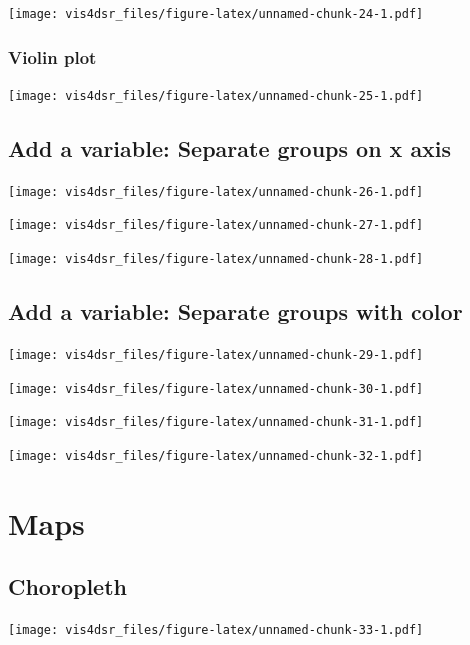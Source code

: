 \documentclass[
]{krantz}
\begin{document}
\texttt{[image: vis4dsr\_files/figure-latex/unnamed-chunk-24-1.pdf]}

\hypertarget{violin-plot}{%
\subsubsection{Violin plot}\label{violin-plot}}

\texttt{[image: vis4dsr\_files/figure-latex/unnamed-chunk-25-1.pdf]}

\hypertarget{add-a-variable-separate-groups-on-x-axis}{%
\subsection{Add a variable: Separate groups on x axis}\label{add-a-variable-separate-groups-on-x-axis}}

\texttt{[image: vis4dsr\_files/figure-latex/unnamed-chunk-26-1.pdf]}

\texttt{[image: vis4dsr\_files/figure-latex/unnamed-chunk-27-1.pdf]}

\texttt{[image: vis4dsr\_files/figure-latex/unnamed-chunk-28-1.pdf]}

\hypertarget{add-a-variable-separate-groups-with-color}{%
\subsection{Add a variable: Separate groups with color}\label{add-a-variable-separate-groups-with-color}}

\texttt{[image: vis4dsr\_files/figure-latex/unnamed-chunk-29-1.pdf]}

\texttt{[image: vis4dsr\_files/figure-latex/unnamed-chunk-30-1.pdf]}

\texttt{[image: vis4dsr\_files/figure-latex/unnamed-chunk-31-1.pdf]}

\texttt{[image: vis4dsr\_files/figure-latex/unnamed-chunk-32-1.pdf]}

\hypertarget{maps}{%
\section{Maps}\label{maps}}

\hypertarget{choropleth}{%
\subsection{Choropleth}\label{choropleth}}

\texttt{[image: vis4dsr\_files/figure-latex/unnamed-chunk-33-1.pdf]}
\end{document}

